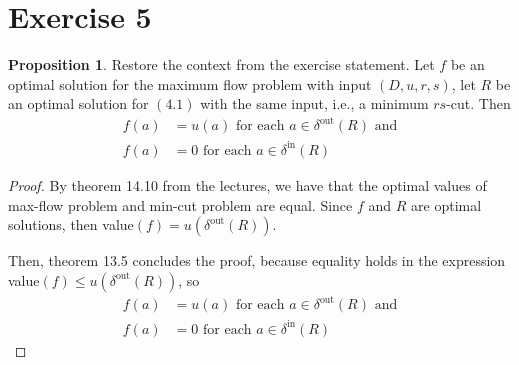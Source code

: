 \documentclass[a4paper,10pt, leqno]{article}
\theoremstyle{definition}
\def\blankpage{%
      \null%
      \clearpage}
\begin{document}
\blankpage

\section*{Exercise 5}
\newtheorem{proposition}{Proposition}

\begin{proposition}
    Restore the context from the exercise statement. Let $f$ be an optimal solution for  the maximum flow problem with input $(D, u, r, s)$, let $R$ be an optimal solution for $(4.1)$ with the same input, i.e., a minimum $rs$-cut. Then 
    \begin{align*}
     f(a) &= u(a) \text{ for each } a \in \delta^{\text{out}}(R) \text{ and} \\
     f(a) &= 0 \text{ for each } a \in \delta^{\text{in}}(R)
    \end{align*}
    
\end{proposition}
\begin{proof}
    By theorem 14.10 from the lectures, we have that the optimal values of max-flow problem and min-cut problem are equal. Since $f$ and $R$ are optimal solutions, then value$(f) = u(\delta^{\text{out}}(R))$.
    
    Then, theorem 13.5 concludes the proof, because equality holds in the expression value$(f) \leq u(\delta^{\text{out}}(R))$, so 
    \begin{align*}
     f(a) &= u(a) \text{ for each } a \in \delta^{\text{out}}(R) \text{ and} \\
     f(a) &= 0 \text{ for each } a \in \delta^{\text{in}}(R)
    \end{align*}
\end{proof}
\end{document}
